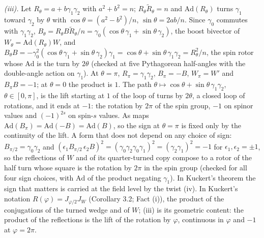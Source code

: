 \emph{(iii).} Let $R_{\theta} = a + b\gamma_{1}\gamma_{2}$ with $a^{2} + b^{2} = n$; $R_{\theta}\tilde R_{\theta} = n$ and $\mathrm{Ad}(R_{\theta})$ turns $\gamma_{1}$ toward $\gamma_{2}$ by $\theta$ with $\cos\theta = (a^{2} - b^{2})/n$, $\sin\theta = 2ab/n$. Since $\gamma_{0}$ commutes with $\gamma_{1}\gamma_{2}$, $B_{\theta} = R_{\theta}B\tilde R_{\theta}/n = \gamma_{0}(\cos\theta\,\gamma_{1} + \sin\theta\,\gamma_{2})$, the boost bivector of $W_{\theta} = \mathrm{Ad}(R_{\theta})W$, and $B_{\theta}B = -\gamma_{0}^{2}(\cos\theta\,\gamma_{1} + \sin\theta\,\gamma_{2})\gamma_{1} = \cos\theta + \sin\theta\,\gamma_{1}\gamma_{2} = R_{\theta}^{2}/n$, the spin rotor whose $\mathrm{Ad}$ is the turn by $2\theta$ (checked at five Pythagorean half-angles with the double-angle action on $\gamma_{1}$). At $\theta = \pi$, $R_{\pi} = \gamma_{1}\gamma_{2}$, $B_{\pi} = -B$, $W_{\pi} = W'$ and $B_{\pi}B = -1$; at $\theta = 0$ the product is $1$. The path $\theta \mapsto \cos\theta + \sin\theta\,\gamma_{1}\gamma_{2}$, $\theta \in [0, \pi]$, is the lift starting at $1$ of the loop of turns by $2\theta$, a closed loop of rotations, and it ends at $-1$: the rotation by $2\pi$ of the spin group, $-1$ on spinor values and $(-1)^{2s}$ on spin-$s$ values. As maps $\mathrm{Ad}(B_{\pi}) = \mathrm{Ad}(-B) = \mathrm{Ad}(B)$, so the sign at $\theta = \pi$ is fixed only by the continuity of the lift. A form that does not depend on any choice of sign: $B_{\pi/2} = \gamma_{0}\gamma_{2}$ and $(\epsilon_{1}B_{\pi/2}\,\epsilon_{2}B)^{2} = (\gamma_{0}\gamma_{2}\gamma_{0}\gamma_{1})^{2} = (\gamma_{2}\gamma_{1})^{2} = -1$ for $\epsilon_{1}, \epsilon_{2} = \pm 1$, so the reflections of $W$ and of its quarter-turned copy compose to a rotor of the half turn whose square is the rotation by $2\pi$ in the spin group (checked for all four sign choices, with $\mathrm{Ad}$ of the product negating $\gamma_{1}$). In Kuckert's theorem the sign that matters is carried at the field level by the twist (iv). In Kuckert's notation $R(\varphi) = J_{\varphi/2}J_{W}$ \cite{Kuckert1995} (Corollary 3.2; Fact (i)), the product of the conjugations of the turned wedge and of $W$; (iii) is its geometric content: the product of the reflections is the lift of the rotation by $\varphi$, continuous in $\varphi$ and $-1$ at $\varphi = 2\pi$.

